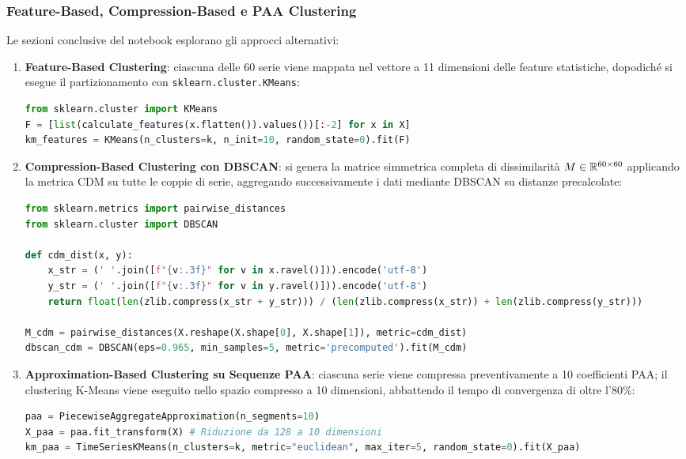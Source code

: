 \FloatBarrier
\subsubsection{Feature-Based, Compression-Based e PAA Clustering}
\label{subsec:ts-lab-alternative-clusterings}

Le sezioni conclusive del notebook esplorano gli approcci alternativi:

\begin{enumerate}
    \item \textbf{Feature-Based Clustering}: ciascuna delle 60 serie viene mappata nel vettore a 11 dimensioni delle feature statistiche, dopodich\'e si esegue il partizionamento con \texttt{sklearn.cluster.KMeans}:
\begin{lstlisting}[language=Python, style=code]
from sklearn.cluster import KMeans
F = [list(calculate_features(x.flatten()).values())[:-2] for x in X]
km_features = KMeans(n_clusters=k, n_init=10, random_state=0).fit(F)
\end{lstlisting}

    \item \textbf{Compression-Based Clustering con DBSCAN}: si genera la matrice simmetrica completa di dissimilarit\`a $M \in \mathbb{R}^{60 \times 60}$ applicando la metrica CDM su tutte le coppie di serie, aggregando successivamente i dati mediante DBSCAN su distanze precalcolate:
\begin{lstlisting}[language=Python, style=code]
from sklearn.metrics import pairwise_distances
from sklearn.cluster import DBSCAN

def cdm_dist(x, y):
    x_str = (' '.join([f"{v:.3f}" for v in x.ravel()])).encode('utf-8')
    y_str = (' '.join([f"{v:.3f}" for v in y.ravel()])).encode('utf-8')
    return float(len(zlib.compress(x_str + y_str))) / (len(zlib.compress(x_str)) + len(zlib.compress(y_str)))

M_cdm = pairwise_distances(X.reshape(X.shape[0], X.shape[1]), metric=cdm_dist)
dbscan_cdm = DBSCAN(eps=0.965, min_samples=5, metric='precomputed').fit(M_cdm)
\end{lstlisting}

    \item \textbf{Approximation-Based Clustering su Sequenze PAA}: ciascuna serie viene compressa preventivamente a 10 coefficienti PAA; il clustering K-Means viene eseguito nello spazio compresso a 10 dimensioni, abbattendo il tempo di convergenza di oltre l'80\%:
\begin{lstlisting}[language=Python, style=code]
paa = PiecewiseAggregateApproximation(n_segments=10)
X_paa = paa.fit_transform(X) # Riduzione da 128 a 10 dimensioni
km_paa = TimeSeriesKMeans(n_clusters=k, metric="euclidean", max_iter=5, random_state=0).fit(X_paa)
\end{lstlisting}
\end{enumerate}

